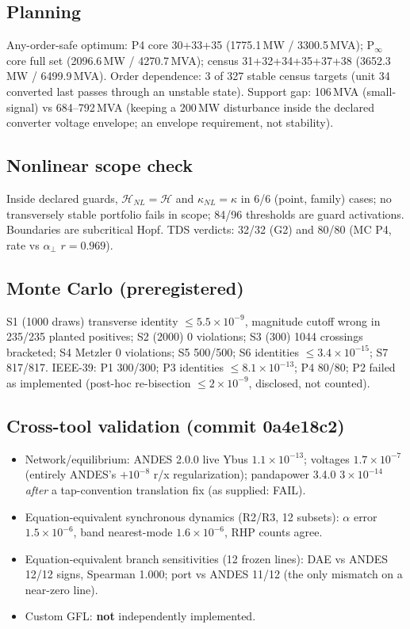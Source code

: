 \documentclass[10pt,a4paper]{article}
\theoremstyle{definition}
\newcommand{\Hy}{\mathcal{H}}
\newcommand{\aperp}{\alpha_\perp}
\begin{document}
\subsection{Planning}
Any-order-safe optimum: P4 core 30+33+35 (1775.1\,MW / 3300.5\,MVA); P$_\infty$ core full set
(2096.6\,MW / 4270.7\,MVA); census 31+32+34+35+37+38 (3652.3\,MW / 6499.9\,MVA). Order dependence: 3 of
327 stable census targets (unit 34 converted last passes through an unstable state).
Support gap: 106\,MVA (small-signal) vs 684--792\,MVA (keeping a 200\,MW disturbance inside the declared
converter voltage envelope; an envelope requirement, not stability).

\subsection{Nonlinear scope check}
Inside declared guards, $\Hy_{NL}=\Hy$ and $\kappa_{NL}=\kappa$ in 6/6 (point, family) cases; no transversely
stable portfolio fails in scope; 84/96 thresholds are guard activations. Boundaries are subcritical Hopf.
TDS verdicts: 32/32 (G2) and 80/80 (MC P4, rate vs $\aperp$ $r=0.969$).

\subsection{Monte Carlo (preregistered)}
S1 (1000 draws) transverse identity $\le5.5\times10^{-9}$, magnitude cutoff wrong in 235/235 planted
positives; S2 (2000) 0 violations; S3 (300) 1044 crossings bracketed; S4 Metzler 0 violations; S5 500/500;
S6 identities $\le3.4\times10^{-15}$; S7 817/817. IEEE-39: P1 300/300; P3 identities $\le8.1\times10^{-13}$;
P4 80/80; P2 failed as implemented (post-hoc re-bisection $\le2\times10^{-9}$, disclosed, not counted).

\subsection{Cross-tool validation (commit 0a4e18c2)}
\begin{itemize}
\item Network/equilibrium: ANDES 2.0.0 live Ybus $1.1\times10^{-13}$; voltages $1.7\times10^{-7}$
(entirely ANDES's $+10^{-8}$ r/x regularization); pandapower 3.4.0 $3\times10^{-14}$ \emph{after} a tap-convention
translation fix (as supplied: FAIL).
\item Equation-equivalent synchronous dynamics (R2/R3, 12 subsets): $\alpha$ error $1.5\times10^{-6}$, band
nearest-mode $1.6\times10^{-6}$, RHP counts agree.
\item Equation-equivalent branch sensitivities (12 frozen lines): DAE vs ANDES 12/12 signs, Spearman 1.000;
port vs ANDES 11/12 (the only mismatch on a near-zero line).
\item Custom GFL: \textbf{not} independently implemented.
\end{itemize}
\end{document}
